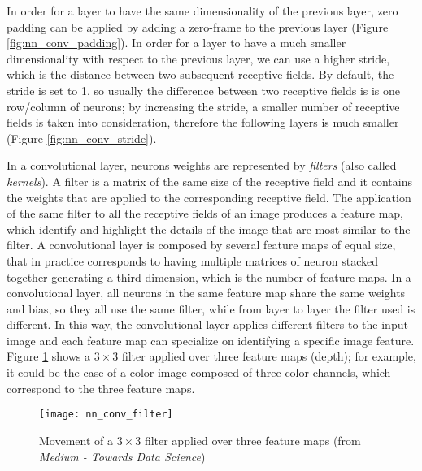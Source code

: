 In order for a layer to have the same dimensionality of the previous layer, zero padding can be applied by adding a zero-frame to the previous layer (Figure \ref{fig:nn_conv_padding}). In order for a layer to have a much smaller dimensionality with respect to the previous layer, we can use a higher stride, which is the distance between two subsequent receptive fields. By default, the stride is set to 1, so usually the difference between two receptive fields is is one row/column of neurons; by increasing the stride, a smaller number of receptive fields is taken into consideration, therefore the following layers is much smaller (Figure \ref{fig:nn_conv_stride}).

In a convolutional layer, neurons weights are represented by \textit{filters} (also called \textit{kernels}). A filter is a matrix of the same size of the receptive field and it contains the weights that are applied to the corresponding receptive field. The application of the same filter to all the receptive fields of an image produces a feature map, which identify and highlight the details of the image that are most similar to the filter. A convolutional layer is composed by several feature maps of equal size, that in practice corresponds to having multiple matrices of neuron stacked together generating a third dimension, which is the number of feature maps. In a convolutional layer, all neurons in the same feature map share the same weights and bias, so they all use the same filter, while from layer to layer the filter used is different. In this way, the convolutional layer applies different filters to the input image and each feature map can specialize on identifying a specific image feature. Figure \ref{fig:nn_conv_filter} shows a $3\times3$ filter applied over three feature maps (depth); for example, it could be the case of a color image composed of three color channels, which correspond to the three feature maps.
\begin{figure}[htbp]
    \centering
    \texttt{[image: nn\_conv\_filter]}
    \caption{Movement of a $3\times3$ filter applied over three feature maps (from \textit{Medium - Towards Data Science})}
    \label{fig:nn_conv_filter}
\end{figure}

